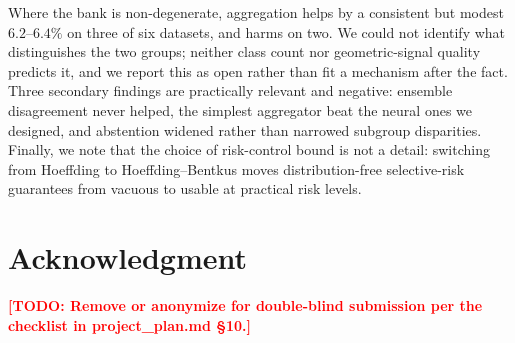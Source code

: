 \documentclass[conference]{IEEEtran}
\newcommand{\todo}[1]{\textcolor{red}{\textbf{[TODO: #1]}}}
\begin{document}
Where the bank is non-degenerate, aggregation helps by a consistent but
modest $6.2$--$6.4\%$ on three of six datasets, and harms on two. We could
not identify what distinguishes the two groups; neither class count nor
geometric-signal quality predicts it, and we report this as open rather
than fit a mechanism after the fact. Three secondary findings are
practically relevant and negative: ensemble disagreement never helped, the
simplest aggregator beat the neural ones we designed, and abstention
widened rather than narrowed subgroup disparities. Finally, we note that
the choice of risk-control bound is not a detail: switching from Hoeffding
to Hoeffding--Bentkus moves distribution-free selective-risk guarantees
from vacuous to usable at practical risk levels.

\section*{Acknowledgment}
\todo{Remove or anonymize for double-blind submission per the checklist in
project\_plan.md \S10.}



\end{document}
